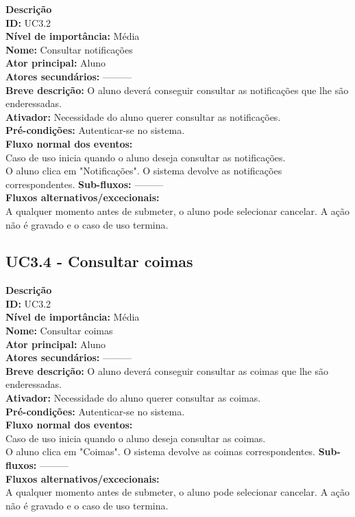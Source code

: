 \noindent \textbf{Descrição} \\
\textbf{ID:} UC3.2 \\  
\textbf{Nível de importância:} Média \\
\textbf{Nome:} Consultar notificações \\
\textbf{Ator principal:} Aluno \\
\textbf{Atores secundários:} --------- \\
\textbf{Breve descrição:} O aluno deverá conseguir consultar as notificações que lhe são enderessadas. \\ 
\textbf{Ativador:} Necessidade do aluno querer consultar as notificações.\\
\textbf{Pré-condições:} Autenticar-se no sistema. \\
\textbf{Fluxo normal dos eventos:} \\
	\indent Caso de uso inicia quando o aluno deseja consultar as notificações. \\
	\indent O aluno clica em "Notificações".
	\indent O sistema devolve as notificações correspondentes.
\textbf{Sub-fluxos:} ---------\\
\textbf{Fluxos alternativos/excecionais:}  \\
	\indent A qualquer momento antes de submeter, o aluno pode selecionar cancelar. A ação não é gravado e o caso de uso termina.\\

	\subsection{UC3.4 - Consultar coimas}
\vspace*{5mm}

\noindent \textbf{Descrição} \\
\textbf{ID:} UC3.2 \\  
\textbf{Nível de importância:} Média \\
\textbf{Nome:} Consultar coimas \\
\textbf{Ator principal:} Aluno \\
\textbf{Atores secundários:} --------- \\
\textbf{Breve descrição:} O aluno deverá conseguir consultar as coimas que lhe são enderessadas. \\ 
\textbf{Ativador:} Necessidade do aluno querer consultar as coimas.\\
\textbf{Pré-condições:} Autenticar-se no sistema. \\
\textbf{Fluxo normal dos eventos:} \\
	\indent Caso de uso inicia quando o aluno deseja consultar as coimas. \\
	\indent O aluno clica em "Coimas".
	\indent O sistema devolve as coimas correspondentes.
\textbf{Sub-fluxos:} ---------\\
\textbf{Fluxos alternativos/excecionais:}  \\
	\indent A qualquer momento antes de submeter, o aluno pode selecionar cancelar. A ação não é gravado e o caso de uso termina.\\

\newpage